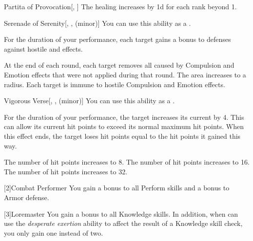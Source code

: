 {\begin{freeability}{Partita of Provocation}[, ]
                \rankline
                The healing increases by \plus1d for each rank beyond 1.
            \end{freeability}

            \begin{freeability}{Serenade of Serenity}[, ,  (minor)]
                You can use this ability as a .

                For the duration of your performance, each target gains a  bonus to defenses against hostile  and  effects.

                \rankline
                 At the end of each round, each target removes all  caused by Compulsion and Emotion effects that were not applied during that round.
                 The area increases to a \areahuge radius.
                 Each target is immune to hostile Compulsion and Emotion effects.
            \end{freeability}

            \begin{freeability}{Vigorous Verse}[, ,  (minor)]
                You can use this ability as a .

                For the duration of your performance, the target increases its current  by 4.
                This can allow its current hit points to exceed its normal maximum hit points.
                When this effect ends, the target loses hit points equal to the hit points it gained this way.

                \rankline
                 The number of hit points increases to 8.
                 The number of hit points increases to 16.
                 The number of hit points increases to 32.
            \end{freeability}
        }

        [2]{Combat Performer} You gain a  bonus to all Perform skills and a  bonus to Armor defense.

        [3]{Loremaster} You gain a  bonus to all Knowledge skills.
        In addition, when can use the \textit{desperate exertion} ability to affect the result of a Knowledge skill check,
            you only gain one  instead of two.

